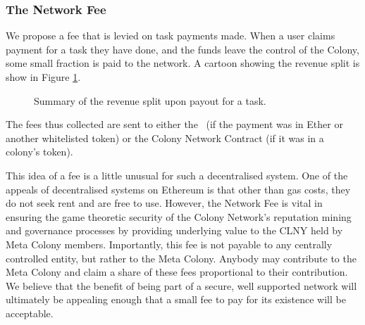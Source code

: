 \subsubsection{The Network Fee}\label{sec:networkfee}
We propose a fee that is levied on task payments made. When a user claims payment for a task they have done, and the funds leave the control of the Colony, some small fraction is paid to the network. A cartoon showing the revenue split is show in Figure \ref{fig:revenueSplit}.

\begin{figure}[htp]
\centering
 \caption{Summary of the revenue split upon payout for a task.}
 \label{fig:revenueSplit}

\end{figure}

The fees thus collected are sent to either the \rc\ (if the payment was in Ether or another whitelisted token) or the Colony Network Contract (if it was in a colony's token).

This idea of a fee is a little unusual for such a decentralised system. One of the appeals of decentralised systems on Ethereum is that other than gas costs, they do not seek rent and are free to use. However, the Network Fee is vital in ensuring the game theoretic security of the Colony Network's reputation mining and governance processes by providing underlying value to the CLNY held by Meta Colony members. Importantly, this fee is not payable to any centrally controlled entity, but rather to the Meta Colony. Anybody may contribute to the Meta Colony and claim a share of these fees proportional to their contribution. We believe that the benefit of being part of a secure, well supported network will ultimately be appealing enough that a small fee to pay for its existence will be acceptable.

